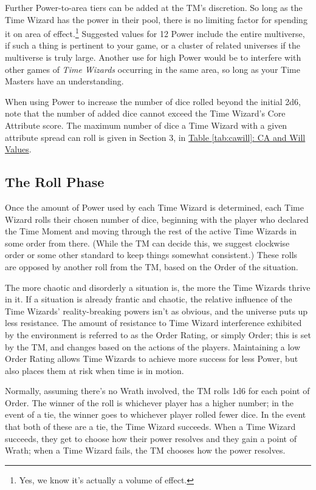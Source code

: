 \documentclass{article}
\newcommand{\tw}{\emph{Time Wizards}}
\begin{document}
Further Power-to-area tiers can be added at the TM's discretion. So long as the Time Wizard has
the power in their pool, there is no limiting factor for spending it on area of
effect.\footnote{Yes, we know it's actually a volume of effect.} Suggested values for 12 Power
include the entire multiverse, if such a thing is pertinent to your game, or a cluster of
related universes if the multiverse is truly large. Another use for high Power would be to
interfere with other games of \tw{} occurring in the same area, so long as your Time Masters
have an understanding.

When using Power to increase the number of dice rolled beyond the initial 2d6, note that the
number of added dice cannot exceed the Time Wizard's Core Attribute score. The maximum number
of dice a Time Wizard with a given attribute spread can roll is given in Section 3, in
\hyperref[tab:cawill]{Table \ref*{tab:cawill}: CA and Will Values}.

\subsection{The Roll Phase} \label{ssec:roll-phase}
Once the amount of Power used by each Time Wizard is determined, each Time Wizard rolls their
chosen number of dice, beginning with the player who declared the Time Moment and moving through
the rest of the active Time Wizards in some order from there. (While the TM can decide this, we
suggest clockwise order or some other standard to keep things somewhat consistent.) These rolls
are opposed by another roll from the TM, based on the Order of the situation.

The more chaotic and disorderly a situation is, the more the Time Wizards thrive in it. If a
situation is already frantic and chaotic, the relative influence of the Time Wizards'
reality-breaking powers isn't as obvious, and the universe puts up less resistance. The amount
of resistance to Time Wizard interference exhibited by the environment is referred to as the
Order Rating, or simply Order; this is set by the TM, and changes based on the actions of the
players. Maintaining a low Order Rating allows Time Wizards to achieve more success for less
Power, but also places them at risk when time is in motion.

Normally, assuming there's no Wrath involved, the TM rolls 1d6 for each point of Order. The
winner of the roll is whichever player has a higher number; in the event of a tie, the winner
goes to whichever player rolled fewer dice. In the event that both of these are a tie, the
Time Wizard succeeds. When a Time Wizard succeeds, they get to choose how their power resolves
and they gain a point of Wrath; when a Time Wizard fails, the TM chooses how the power resolves.
\end{document}
